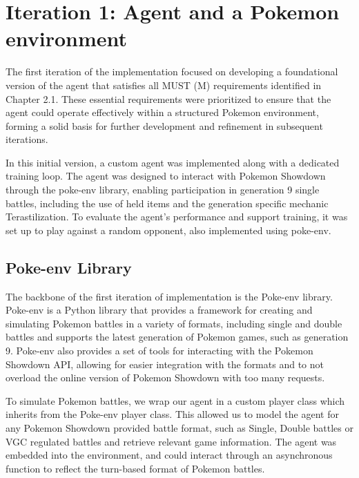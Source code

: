\section{Iteration 1: Agent and a Pokemon environment} 
\label{sec:Iteration-1-Agent-Environment}

The first iteration of the implementation focused on developing a foundational version of the 
agent that satisfies all MUST (M) requirements identified in Chapter 2.1. These essential requirements 
were prioritized to ensure that the agent could operate effectively within a structured Pokemon environment, 
forming a solid basis for further development and refinement in subsequent iterations.

In this initial version, a custom agent was implemented along with a dedicated training loop. The agent was 
designed to interact with Pokemon Showdown through the poke-env library, enabling participation in generation 9 single battles, 
including the use of held items and the generation specific mechanic Terastilization. To evaluate the agent's 
performance and support training, it was set up to play against a random opponent, also implemented using poke-env. 



\subsection{Poke-env Library}
The backbone of the first iteration of implementation is the Poke-env library. 
Poke-env is a Python library that provides a framework for creating and simulating Pokemon
battles in a variety of formats, including single and double battles and supports the latest
generation of Pokemon games, such as generation 9. Poke-env also provides a set of tools
for interacting with the Pokemon Showdown API, allowing for easier integration with the formats
and to not overload the online version of Pokemon Showdown with too many requests.

To simulate Pokemon battles, we wrap our agent in a custom player class which inherits from the
Poke-env player class. This allowed us to model the agent for any Pokemon Showdown 
provided battle format, such as Single, Double battles or VGC regulated battles and 
retrieve relevant game information. The agent was embedded into the environment, and could 
interact through an asynchronous function to reflect the turn-based format of Pokemon battles.



